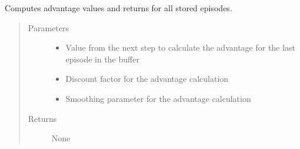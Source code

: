 \documentclass[letterpaper,10pt,english]{sphinxmanual}
\begin{document}
\begin{fulllineitems}
\begin{fulllineitems}
\begin{quote}
\begin{description}
\end{description}\end{quote}

\end{fulllineitems}


\begin{fulllineitems}
\label{\detokenize{agents.reinforcement_learning:agents.reinforcement_learning.ppo.RolloutBuffer.compute_advantages_and_returns}}
\sphinxAtStartPar
Computes advantage values and returns for all stored episodes.
\begin{quote}\begin{description}
\item[{Parameters}] \leavevmode\begin{itemize}
\item {} 
\sphinxAtStartPar
{} \textendash{} Value from the next step to calculate the advantage for the last episode in the buffer

\item {} 
\sphinxAtStartPar
{} \textendash{} Discount factor for the advantage calculation

\item {} 
\sphinxAtStartPar
{} \textendash{} Smoothing parameter for the advantage calculation

\end{itemize}

\item[{Returns}] \leavevmode
\sphinxAtStartPar
None

\end{description}\end{quote}

\end{fulllineitems}



\end{fulllineitems}
\end{document}
